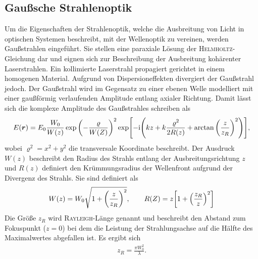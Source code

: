 \documentclass[a4paper,twoside,final]{article}
\begin{document}
\subsection{Gaußsche Strahlenoptik}
Um die Eigenschaften der Strahlenoptik, welche die Ausbreitung von Licht in optischen Systemen beschreibt, mit der Wellenoptik zu vereinen, werden Gaußstrahlen eingeführt. Sie stellen eine paraxiale Lösung der \textsc{Helmholtz}-Gleichung dar und eignen sich zur Beschreibung der Ausbreitung kohärenter Laserstrahlen. Ein kollimierte Laserstrahl propagiert gerichtet in einem homogenen Material. Aufgrund von Dispersioneffekten divergiert der Gaußstrahl jedoch. Der Gaußstrahl wird im Gegensatz zu einer ebenen Welle modelliert mit einer gaußförmig verlaufenden Amplitude entlang axialer Richtung. Damit lässt sich die komplexe Amplitude des Gaußstrahles schreiben als~\cite{Saleh}
\begin{align}
  E(\bm{r}) = E_0 \frac{W_0}{W(z)} \exp\qty(-\frac{\varrho}{W(Z)})^2 \exp[-\mathrm{i}\qty(kz + k \frac{\varrho^2}{2R(z)}+ \arctan\qty(\frac{z}{z_R})^2)],
\end{align}
wobei $\varrho^2 = x^2 + y^2$ die transversale Koordinate beschreibt. Der Ausdruck $W(z)$ beschreibt den Radius des Strahls entlang der Ausbreitungsrichtung $z$ und $R(z)$ definiert den Krümmungsradius der Wellenfront aufgrund der Divergenz des Strahls. Sie sind definiert als
\begin{align}\label{eqn:Strahlradius_Krümmung}
  W(z) = W_0 \sqrt{1+\qty(\frac{z}{z_R})^2}, \qquad R(Z) = z \qty[1+\qty(\frac{z_R}{z})^2]
\end{align}
Die Größe $z_R$ wird \textsc{Rayleigh}-Länge genannt und beschreibt den Abstand zum Fokuspunkt ($z=0$) bei dem die Leistung der Strahlungsachse auf die Hälfte des Maximalwertes abgefallen ist. Es ergibt sich
\begin{align}\label{eqn:z_r}
  z_R = \frac{\pi W_0^2}{\lambda}.
\end{align}
\end{document}
